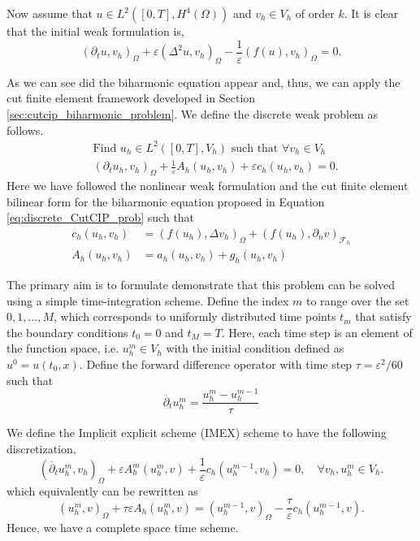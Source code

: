 Now assume that $u \in L^2( [0,T], H^{4}( \Omega ) ) $ and $v_{h} \in  V_{h}$ of order $k$. It is clear that the initial weak formulation is,
\begin{equation}
    ( \partial_{t} u,v_{h} )_{\Omega }  + \varepsilon ( \Delta ^2u, v_{h})_{\Omega } - \frac{1}{\varepsilon } ( f( u), v_{h} )_{\Omega } = 0.
\end{equation}

As we can see did the biharmonic equation appear and, thus, we can apply the cut finite element framework developed in Section \ref{sec:cutcip_biharmonic_problem}. We define the discrete weak problem as follows.
\begin{equation}
    \begin{split}
        & \text{Find  }u_{h} \in L^{2}( [0,T],V_{h})  \text{ such that } \forall v_{h} \in V_{h} \\
        & ( \partial_{t} u_{h},v_{h} )_{\Omega }   + \frac{1}{\varepsilon }A_{h}( u_{h},v_{h})   + \varepsilon c_{h}( u_{h},v_{h})  = 0.
    \end{split}
\end{equation}
Here we have followed the nonlinear weak formulation \cite[Equation
4.2]{feng2007fully} and the cut finite element bilinear form for the biharmonic equation proposed in Equation \eqref{eq:discrete_CutCIP_prob} such that
\begin{align}
    c_{h}( u_{h}, v_{h})  & = ( f( u_{h}) ,\Delta v_{h})_{\Omega } +  ( f( u_{h}) , \partial _{n}v)_{\mathcal{F}_{h} } \\
    A_{h}( u_{h}, v_{h})  & =  a_{h}( u_{h}, v_{h}) + g_{h}( u_{h}, v_{h})
\end{align}

The primary aim is to formulate demonstrate that this problem can be solved using a simple time-integration scheme. Define the index $m$ to range over the set ${0, 1, \ldots, M}$, which corresponds to uniformly distributed time points $t_{m}$ that satisfy the boundary conditions $t_{0} = 0$
and $t_{M} = T$. Here, each time step is an element of the function space, i.e. $u^{m}_{h} \in V_{h}$  with the initial condition defined as $u^{0} = u( t_{0},x )$.
Define the forward difference operator with time step $\tau = \varepsilon^{2} /60 $ such that
\begin{equation}
\overline{\partial } _{t} u_{h}^{m} = \frac{u_{h}^{m} - u_{h}^{m-1}}{ \tau }
\end{equation}

We define the Implicit explicit scheme (IMEX) scheme to have the following discretization,
\begin{equation}
( \overline{\partial } _{t} u^{m}_{h}, v_{h}   )_{\Omega } + \varepsilon A^{m}_{h}( u_{h}^{m} , v) + \frac{1}{\varepsilon } c_{h} (  u_{h}^{m-1}, v_{h})  = 0 , \quad \forall v_{h}, u^{m}_{h} \in V^{}_{h}.
\end{equation}
which equivalently can be rewritten as
\begin{equation}
( u_{h}^{m},v )_{\Omega }  + \tau \varepsilon A_{h}( u_{h}^{m} , v)   =  ( u_{h}^{m-1},v )_{\Omega } - \frac{\tau}{\varepsilon } c_{h} (  u_{h}^{m-1}, v) .
\end{equation}
Hence, we have a complete space time scheme.


